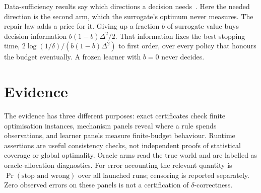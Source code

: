 Data-sufficiency results say which directions a decision needs~\cite{bennouna2025}. Here the
needed direction is the second arm, which the surrogate's optimum never measures. The repair
law adds a price for it. Giving up a fraction $b$ of surrogate value buys decision information
$b(1-b)\Delta^2/2$. That information fixes the best stopping time,
$2\log(1/\delta)/(b(1-b)\Delta^2)$ to first order, over every policy that honours the budget
eventually. A frozen learner with $b=0$ never decides.

\section{Evidence}
\label{sec:evidence}

The evidence has three different purposes: exact certificates check finite optimisation
instances, mechanism panels reveal where a rule spends observations, and learner panels measure
finite-budget behaviour. Runtime assertions are useful consistency checks, not independent
proofs of statistical coverage or global optimality. Oracle arms read the true world and are
labelled as oracle-allocation diagnostics. For error accounting the relevant quantity is
$\Pr(\text{stop and wrong})$ over all launched runs; censoring is reported separately.
Zero observed errors on these panels is not a certification of $\delta$-correctness.

\begin{table}[t]
\caption{Evidence packages. Each script self-checks against a Lean statement.}
\label{tab:evidence}
\centering
\footnotesize
{}
\end{table}

